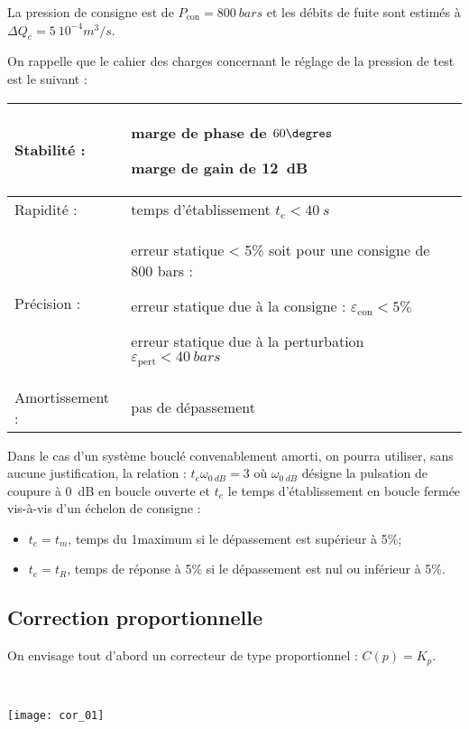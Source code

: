 La pression de consigne est de $P_{\text{con}} = \SI{800}{bars}$ et les débits de fuite sont estimés à $\Delta Q_e = \SI{5}{10^{-4} m^3/s}$.

On rappelle que le cahier des charges concernant le réglage de la pression de test est le suivant :
\begin{center}
\begin{tabular}{lp{8cm}}
\hline
Stabilité : & marge de phase de $60\degres$

 marge de gain de \SI{12}{dB} \\ \hline
Rapidité :	&temps d’établissement $t_e < \SI{40}{s}$ \\ \hline
Précision :&	erreur statique < 5\% soit pour une consigne de 800 bars :

erreur statique due à la consigne : $\varepsilon_{\text{con}} < 5\%$ 

erreur statique due à la perturbation $\varepsilon_{\text{pert}} < \SI{40}{bars}$ \\ \hline

Amortissement :&	pas de dépassement \\ \hline
\end{tabular}
\end{center}

Dans le cas d’un système bouclé convenablement amorti, on pourra utiliser, sans aucune justification, la relation : 	$t_e \omega_{\SI{0}{dB}}=3$ 
où $\omega_{\SI{0}{dB}}$ désigne la pulsation de coupure à \SI{0}{dB} en boucle ouverte et $t_e$ le temps d’établissement en boucle fermée vis-à-vis d’un échelon de consigne :
\begin{itemize}
\item $t_e = t_m$, temps du 1\ier maximum si le dépassement est supérieur à 5\%;
\item $t_e = t_R$, temps de réponse à 5\% si le dépassement est nul ou inférieur à 5\%.
\end{itemize}
\fi

\subsection*{Correction proportionnelle}
On envisage tout d’abord un correcteur de type proportionnel : $C(p)=K_p$. 



\ifprof
\begin{corrige}~\\

\begin{center}
\texttt{[image: cor\_01]}
\end{center}
\end{corrige}
\else
\fi

